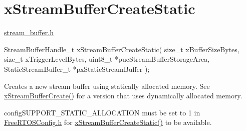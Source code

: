 \hypertarget{group__x_stream_buffer_create_static}{}\section{x\+Stream\+Buffer\+Create\+Static}
\label{group__x_stream_buffer_create_static}
\hyperlink{stream__buffer_8h}{stream\+\_\+buffer.\+h}


\begin{DoxyPre}
StreamBufferHandle\_t xStreamBufferCreateStatic( size\_t xBufferSizeBytes,
                                                size\_t xTriggerLevelBytes,
                                                uint8\_t *pucStreamBufferStorageArea,
                                                StaticStreamBuffer\_t *pxStaticStreamBuffer );
\end{DoxyPre}
 Creates a new stream buffer using statically allocated memory. See \hyperlink{stream__buffer_8h_a39aa4dd8b83e2df7ded291f863fb5fed}{x\+Stream\+Buffer\+Create()} for a version that uses dynamically allocated memory.

config\+S\+U\+P\+P\+O\+R\+T\+\_\+\+S\+T\+A\+T\+I\+C\+\_\+\+A\+L\+L\+O\+C\+A\+T\+I\+ON must be set to 1 in \hyperlink{_free_r_t_o_s_config_8h}{Free\+R\+T\+O\+S\+Config.\+h} for \hyperlink{stream__buffer_8h_a3c248575ac1b83801db605b32a118f77}{x\+Stream\+Buffer\+Create\+Static()} to be available.


